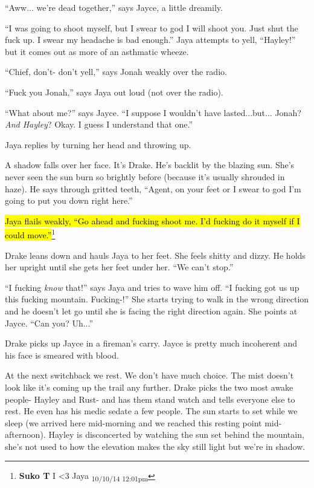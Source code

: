 ``Aww... we're dead together,'' says Jayce, a little dreamily.

``I was going to shoot myself, but I swear to god I will shoot you.  Just shut the fuck up.  I swear my headache is bad enough.''  Jaya attempts to yell, ``Hayley!'' but it comes out as more of an asthmatic wheeze.

``Chief, don't- don't yell,'' says Jonah weakly over the radio.

``Fuck you Jonah,'' says Jaya out loud (not over the radio).

``What about me?'' says Jayce.  ``I suppose I wouldn't have lasted...but... Jonah?  \textit{And Hayley}?  Okay.  I guess I understand that one.''

Jaya replies by turning her head and throwing up.

A shadow falls over her face.  It's Drake.  He's backlit by the blazing sun.  She's never seen the sun burn so brightly before (because it's usually shrouded in haze).   He says through gritted teeth, ``Agent, on your feet or I swear to god I'm going to put you down right here.''

\hl{Jaya flails weakly, ``Go ahead and fucking shoot me.  I'd fucking do it myself if I could move.''}\footnote{\textbf{Suko T }I \textless 3 Jaya \textsubscript{10/10/14 12:01pm}}

Drake leans down and hauls Jaya to her feet.  She feels shitty and dizzy.  He holds her upright until she gets her feet under her.  ``We can't stop.''

``I fucking \textit{know} that!'' says Jaya and tries to wave him off.  ``I fucking got us up this fucking mountain.  Fucking-!''  She starts trying to walk in the wrong direction and he doesn't let go until she is facing the right direction again.  She points at Jayce.  ``Can you? Uh...''

Drake picks up Jayce in a fireman's carry.  Jayce is pretty much incoherent and his face is smeared with blood.  



At the next switchback we rest.   We don't have much choice.  The mist doesn't look like it's coming up the trail any further.  Drake picks the two most awake people- Hayley and Rust- and has them stand watch and tells everyone else to rest.  He even has his medic sedate a few people.  The sun starts to set while we sleep (we arrived here mid-morning and we reached this resting point mid-afternoon).  Hayley is disconcerted by watching the sun set behind the mountain, she's not used to how the elevation makes the sky still light but we're in shadow.  



